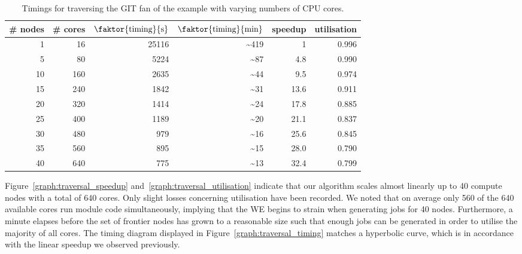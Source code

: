 \begin{table}
	\centering
	\begin{tabular}{@{}rrrrrr@{}}
		\toprule
		\# nodes & \# cores & $\faktor{\text{timing}}{\text{s}}$ & $\faktor{\text{timing}}{\text{min}}$ & speedup & utilisation \\
		\midrule
		1  & 16  & 25116 & \textasciitilde 419 & 1    & 0.996 \\
		5  & 80  & 5224  & \textasciitilde 87  & 4.8  & 0.990 \\
		10 & 160 & 2635  & \textasciitilde 44  & 9.5  & 0.974 \\
		15 & 240 & 1842  & \textasciitilde 31  & 13.6 & 0.911 \\
		20 & 320 & 1414  & \textasciitilde 24  & 17.8 & 0.885 \\
		25 & 400 & 1189  & \textasciitilde 20  & 21.1 & 0.837 \\
		30 & 480 & 979   & \textasciitilde 16  & 25.6 & 0.845 \\
		35 & 560 & 895   & \textasciitilde 15  & 28.0 & 0.790 \\
		40 & 640 & 775   & \textasciitilde 13  & 32.4 & 0.799 \\
		\bottomrule
	\end{tabular}
	\caption{Timings for traversing the GIT fan of the \msix{} example with varying numbers of CPU cores.}
	\label{table:performance_gitfan_traversal}
\end{table}

Figure~\ref{graph:traversal_speedup} and~\ref{graph:traversal_utilisation} indicate that our algorithm scales almost linearly up to 40 compute nodes with a total of 640 cores. Only slight losses concerning utilisation have been recorded. We noted that on average only 560 of the 640 available cores run module code simultaneously, implying that the \ac{WE} begins to strain when generating jobs for 40 nodes. Furthermore, a minute elapses before the set of frontier nodes has grown to a reasonable size such that enough jobs can be generated in order to utilise the majority of all cores. The timing diagram displayed in Figure~\ref{graph:traversal_timing} matches a hyperbolic curve, which is in accordance with the linear speedup we observed previously.

